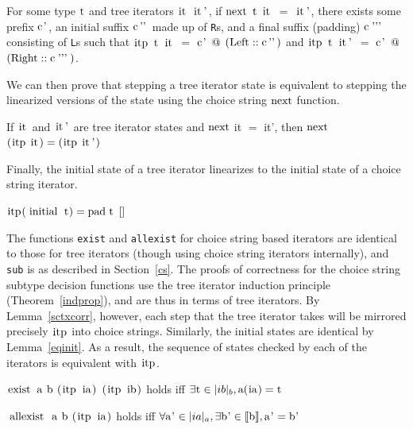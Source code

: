 \documentclass[a4paper,english]{lipics-v2019}
\newcommand{\denotes}[1]{\llbracket #1 \rrbracket}
\newcommand{\Ls}{{\tt L}s\xspace}
\newcommand{\Rs}{{\tt R}s\xspace}
\renewcommand{\c}[1]{\ensuremath{\text{\lstinline{#1}}}\xspace}
\begin{document}
\begin{lemma}
\label{lem:snt}
For some type \c{t} and tree iterators \c{it it'}, if \c{next} \c t \c {it} $=$ \c{it'}, there exists some prefix \c{c'}, an initial suffix \c{c''} made up of \Rs, and a final suffix (padding) \c{c'''} consisting of \Ls such that \c{itp t it} $=$ \c{c'} \c @ $(\c{Left} :: \c{c''})$ and \c{itp t it'} $=$ \c{c'} \c @ $(\c{Right} :: \c{c'''})$.
\end{lemma}
\noindent
We can then prove that stepping a tree iterator state is equivalent to
stepping the linearized versions of the state using the choice string
\c{next} function.

\begin{lemma}\label{sctxcorr}
If \c{it} and \c{it'} are tree iterator states and 
\c{next} it $=$ it', then \c{next} $(\c{itp}\;\c{it}) = (\c{itp}\;\c{it'})$
\end{lemma}
\noindent
Finally, the initial state of a tree iterator linearizes to the
initial state of a choice string iterator.

\begin{lemma}\label{eqinit}
$\c{itp} (\c{initial}\;\c t) = \c{pad}\;\c t \;\c{[]}$
\end{lemma}

The functions \verb|exist| and \verb|allexist| for choice string based
iterators are identical to those for tree iterators (though using choice
string iterators internally), and \verb|sub| is as described in
Section~\ref{cs}. The proofs of correctness for the choice string subtype
decision functions use the tree iterator induction principle
(Theorem~\ref{indprop}), and are thus in terms of tree iterators. By
Lemma~\ref{sctxcorr}, however, each step that the tree iterator takes will be
mirrored precisely \c{itp} into choice strings. Similarly, the initial states
are identical by Lemma~\ref{eqinit}. As a result, the sequence of states
checked by each of the iterators is equivalent with \c{itp}.

\begin{lemma}
\c{exist a b (itp ia) (itp ib)} holds iff $\exists \c t \in \irch{ib}{b}, \c a(\c{ia}) = \c t$
\end{lemma}

\begin{lemma}\label{cstraec}
\c{allexist a b (itp ia)} holds iff $\forall \c{a'} \in \irch{ia}{a}, \exists \c{b'} \in \denotes{\c b}, \c{a'} = \c{b'}$
\end{lemma}
\end{document}
